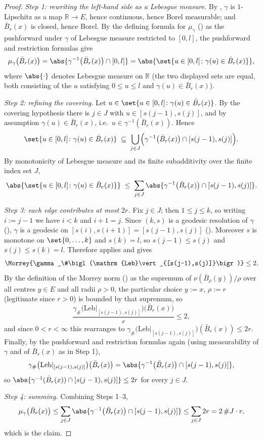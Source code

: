 \begin{proof}
  \emph{Step 1: rewriting the left-hand side as a Lebesgue measure.} By ,
  $\gamma$ is $1$-Lipschitz as a map $\mathbb{R} \to E$, hence continuous, hence Borel measurable;
  and $\bar{B}_r(x)$ is closed, hence Borel. By the defining formula for $\mu_\gamma$
  () as the pushforward under $\gamma$ of Lebesgue measure restricted to
  $[0,l]$, the pushforward and restriction formulas give
  \[
    \mu_\gamma\bigl(\bar{B}_r(x)\bigr)
      = \abs{\gamma^{-1}\bigl(\bar{B}_r(x)\bigr) \cap [0,l]}
      = \abs{\set{ u \in [0,l] \colon \gamma(u) \in \bar{B}_r(x) }}
    ,
  \]
  where $\abs{\cdot}$ denotes Lebesgue measure on $\mathbb{R}$ (the two displayed sets are equal,
  both consisting of the $u$ satisfying $0 \le u \le l$ and $\gamma(u) \in \bar{B}_r(x)$).

  \emph{Step 2: refining the covering.} Let $u \in \set{ u \in [0,l] \colon \gamma(u) \in
  \bar{B}_r(x)}$. By the covering hypothesis there is $j \in J$ with $u \in [s(j-1),s(j)]$, and by
  assumption $\gamma(u) \in \bar{B}_r(x)$, i.e.\ $u \in \gamma^{-1}(\bar{B}_r(x))$. Hence
  \[
    \set{ u \in [0,l] \colon \gamma(u) \in \bar{B}_r(x) } \;\subseteq\;
      \bigcup_{j \in J} \Bigl( \gamma^{-1}\bigl(\bar{B}_r(x)\bigr) \cap [s(j-1),s(j)] \Bigr)
    .
  \]
  By monotonicity of Lebesgue measure and its finite subadditivity over the finite index set $J$,
  \[
    \abs{\set{ u \in [0,l] \colon \gamma(u) \in \bar{B}_r(x)}}
      \;\leq\; \sum_{j \in J} \abs{ \gamma^{-1}\bigl(\bar{B}_r(x)\bigr) \cap [s(j-1),s(j)] }
    .
  \]

  \emph{Step 3: each edge contributes at most $2r$.} Fix $j \in J$; then $1 \le j \le k$, so
  writing $i := j-1$ we have $i < k$ and $i+1 = j$. Since $(k,s)$ is a geodesic resolution of
  $\gamma$ (), $\gamma$ is a geodesic on $[s(i),s(i+1)] =
  [s(j-1),s(j)]$ (). Moreover $s$ is monotone on $\set{0,\dots,k}$ and
  $s(k) = l$, so $s(j-1) \le s(j)$ and $s(j) \le s(k) = l$. Therefore 
  applies and gives
  \[
    \Morrey{\gamma_\#\bigl(\mathrm{Leb}\vert_{[s(j-1),s(j)]}\bigr)} \leq 2
    .
  \]
  By the definition of the Morrey norm () as the supremum of
  $\nu(\bar{B}_\rho(y))/\rho$ over all centres $y \in E$ and all radii $\rho > 0$, the particular
  choice $y := x$, $\rho := r$ (legitimate since $r > 0$) is bounded by that supremum, so
  \[
    \frac{\gamma_\#\bigl(\mathrm{Leb}\vert_{[s(j-1),s(j)]}\bigr)\bigl(\bar{B}_r(x)\bigr)}{r}
      \leq 2
    ,
  \]
  and since $0 < r < \infty$ this rearranges to
  $\gamma_\#\bigl(\mathrm{Leb}\vert_{[s(j-1),s(j)]}\bigr)(\bar{B}_r(x)) \leq 2r$. Finally, by the
  pushforward and restriction formulas again (using measurability of $\gamma$ and of
  $\bar{B}_r(x)$ as in Step 1),
  \[
    \gamma_\#\bigl(\mathrm{Leb}\vert_{[s(j-1),s(j)]}\bigr)\bigl(\bar{B}_r(x)\bigr)
      = \abs{ \gamma^{-1}\bigl(\bar{B}_r(x)\bigr) \cap [s(j-1),s(j)] }
    ,
  \]
  so $\abs{ \gamma^{-1}(\bar{B}_r(x)) \cap [s(j-1),s(j)] } \leq 2r$ for every $j \in J$.

  \emph{Step 4: summing.} Combining Steps 1--3,
  \[
    \mu_\gamma\bigl(\bar{B}_r(x)\bigr)
      \leq \sum_{j \in J} \abs{ \gamma^{-1}\bigl(\bar{B}_r(x)\bigr) \cap [s(j-1),s(j)] }
      \leq \sum_{j \in J} 2r = 2\,\#J \cdot r
    ,
  \]
  which is the claim.
\end{proof}
